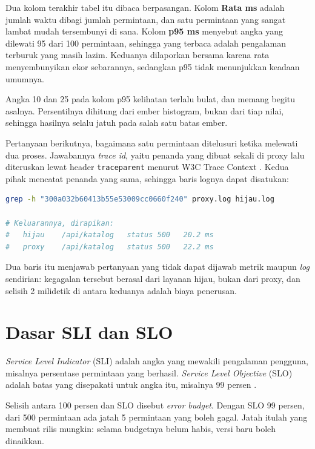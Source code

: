 Dua kolom terakhir tabel itu dibaca berpasangan. Kolom \textbf{Rata ms}
adalah jumlah waktu dibagi jumlah permintaan, dan satu permintaan yang sangat
lambat mudah tersembunyi di sana. Kolom \textbf{p95 ms} menyebut angka yang
dilewati 95 dari 100 permintaan, sehingga yang terbaca adalah pengalaman
terburuk yang masih lazim. Keduanya dilaporkan bersama karena rata
menyembunyikan ekor sebarannya, sedangkan p95 tidak menunjukkan keadaan
umumnya.

Angka 10 dan 25 pada kolom p95 kelihatan terlalu bulat, dan memang begitu
asalnya. Persentilnya dihitung dari ember histogram, bukan dari tiap nilai,
sehingga hasilnya selalu jatuh pada salah satu batas ember.

Pertanyaan berikutnya, bagaimana satu permintaan ditelusuri ketika melewati
dua proses. Jawabannya \textit{trace id}, yaitu penanda yang dibuat sekali di
proxy lalu diteruskan lewat header \texttt{traceparent} menurut W3C Trace
Context \cite{w3c-trace-context}. Kedua pihak mencatat penanda yang sama,
sehingga baris lognya dapat disatukan:

\begin{lstlisting}[language=bash, caption={Menyatukan log dua proses dengan satu trace id, memakai \berkas{sources/chapter09/proxy.py}}, label={lst:trace9}]
grep -h "300a032b60413b55e53009cc0660f240" proxy.log hijau.log

# Keluarannya, dirapikan:
#   hijau    /api/katalog   status 500   20.2 ms
#   proxy    /api/katalog   status 500   22.2 ms
\end{lstlisting}

Dua baris itu menjawab pertanyaan yang tidak dapat dijawab metrik maupun
\textit{log} sendirian: kegagalan tersebut berasal dari layanan hijau, bukan
dari proxy, dan selisih 2 milidetik di antara keduanya adalah biaya
penerusan.

\section{Dasar SLI dan SLO}

\textit{Service Level Indicator} (SLI) adalah angka yang mewakili pengalaman
pengguna, misalnya persentase permintaan yang berhasil.
\textit{Service Level Objective} (SLO) adalah batas yang disepakati untuk
angka itu, misalnya 99 persen \cite{beyer2016sre}.

Selisih antara 100 persen dan SLO disebut \textit{error budget}. Dengan SLO
99 persen, dari 500 permintaan ada jatah 5 permintaan yang boleh gagal.
Jatah itulah yang membuat rilis mungkin: selama budgetnya belum habis, versi
baru boleh dinaikkan.

